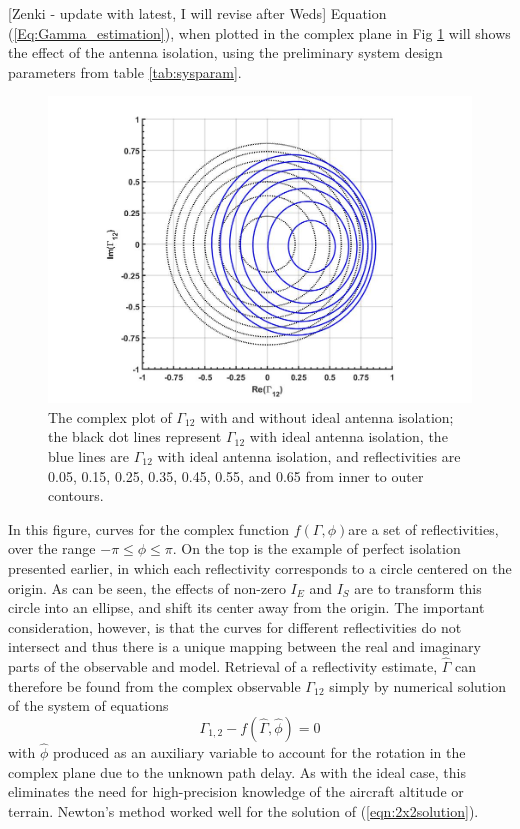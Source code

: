 \documentclass[draftcls,onecolumn]{IEEEtran}  %
\begin{document}
[Zenki - update with latest, I will revise after Weds]
Equation (\ref{Eq:Gamma_estimation}), when plotted in the complex plane in Fig \ref{fig:Gamma12} will shows the effect of the antenna isolation, using the preliminary system design parameters from table \ref{tab:sysparam}. 
\begin{figure}[t!]
	\centering
    \centering
	\includegraphics[width=5 in]{pdf/Gamma12.jpg}
	\caption{The complex plot of $\Gamma_{12}$ with and without ideal antenna isolation; the black dot lines represent $\Gamma_{12}$ with ideal antenna isolation, the blue lines are $\Gamma_{12}$ with ideal antenna isolation, and reflectivities are 0.05, 0.15, 0.25, 0.35, 0.45, 0.55, and 0.65 from inner to outer contours.}
	\label{fig:Gamma12}
\end{figure}

In this figure, curves for the complex function $f(\Gamma, \phi) $are a set of reflectivities, over the range $-\pi \leq \phi \leq \pi$. On the top is the example of perfect isolation presented earlier, in which each reflectivity corresponds to a circle centered on the origin. As can be seen, the effects of non-zero $I_E$ and $I_S$ are to transform this circle into an ellipse, and shift its center away from the origin. The important consideration, however, is that the curves for different reflectivities do not intersect and thus there is a unique mapping between the real and imaginary parts of the observable and model.  Retrieval of a reflectivity estimate, $\hat{\Gamma}$ can therefore be found from the complex observable $\Gamma_{12}$ simply by numerical solution of the system of equations
\begin{equation}
\Gamma_{1,2} - f(\hat{\Gamma}, \hat{\phi}) = 0
\label{eqn:2x2solution}
\end{equation}
with $\hat{\phi}$ produced as an auxiliary  variable to account for the rotation in the complex plane due to the unknown path delay.  As with the ideal case, this eliminates the need for high-precision knowledge of the aircraft altitude or terrain.  Newton's method worked well for the solution of (\ref{eqn:2x2solution}). 
\end{document}
